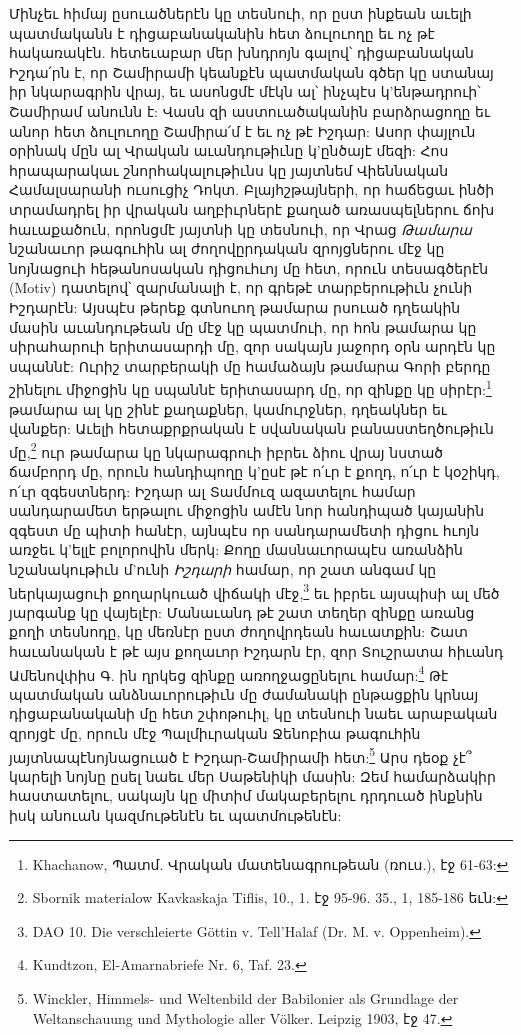 \documentclass{article}
\begin{document}
{Մինչեւ հիմայ ըսուածներէն կը տեսնուի, որ ըստ ինքեան աւելի պատմականն է դիցաբանականին հետ ձուլուողը եւ ոչ թէ հակառակէն. հետեւաբար մեր խնդրոյն գալով՝ դիցաբանական Իշդա՛րն է, որ Շամիրամի կեանքէն պատմական գծեր կը ստանայ իր նկարագրին վրայ, եւ ասոնցմէ մէկն ալ՝ ինչպէս կ'ենթադրուի՝ Շամիրամ անունն է: Վասն զի աստուածականին բարձրացողը եւ անոր հետ ձուլուողը Շամիրա՛մ է եւ ոչ թէ Իշդար: Ասոր փայլուն օրինակ մըն ալ Վրական աւանդութիւնը կ'ընծայէ մեզի: Հոս հրապարակաւ շնորհակալութիւնս կը յայտնեմ Վիեննական Համալսարանի ուսուցիչ Դոկտ. Բլայհշթայների, որ հաճեցաւ ինծի տրամադրել իր վրական աղբիւրներէ քաղած առասպելներու ճոխ հաւաքածուն, որոնցմէ յայտնի կը տեսնուի, որ Վրաց \emph{Թամարա} նշանաւոր թագուհին ալ ժողովըրդական զրոյցներու մէջ կը նոյնացուի հեթանոսական դիցուհւոյ մը հետ, որուն տեսագծերէն (Motiv) դատելով՝ զարմանալի է, որ գրեթէ տարբերութիւն չունի Իշդարէն: Այսպէս թերեք գտնուող թամարա րսուած դղեակին մասին աւանդութեան մը մէջ կը պատմուի, որ հոն թամարա կը սիրահարուի երիտասարդի մը, զոր սակայն յաջորդ օրն արդէն կը սպաննէ: Ուրիշ տարբերակի մը համաձայն թամարա Գորի բերդը շինելու միջոցին կը սպաննէ երիտասարդ մը, որ զինքը կը սիրէր:\footnote{Khachanow, Պատմ. Վրական մատենագրութեան (ռուս.), էջ 61-63:} թամարա ալ կը շինէ քաղաքներ, կամուրջներ, դղեակներ եւ վանքեր: Աւելի հետաքրքրական է սվանական բանաստեղծութիւն մը,\footnote{Sbornik materialow Kavkaskaja Tiflis, 10., 1. էջ 95-96. 35., 1, 185-186 եւն:} ուր թամարա կը նկարագրուի իբրեւ ձիու վրայ նստած ճամբորդ մը, որուն հանդիպողը կ'ըսէ թէ ո՛ւր է քողդ, ո՛ւր է կօշիկդ, ո՛ւր զգեստներդ: Իշդար ալ Տամմուզ ազատելու համար սանդարամետ երթալու միջոցին ամէն նոր հանդիպած կայանին զգեստ մը պիտի հանէր, այնպէս որ սանդարամետի դիցու հւոյն առջեւ կ'ելլէ բոլորովին մերկ: Քողը մասնաւորապէս առանձին նշանակութիւն մ'ունի \emph{Իշդարի} համար, որ շատ անգամ կը ներկայացուի քողարկուած վիճակի մէջ,\footnote{DAO 10. Die verschleierte Göttin v. Tell'Halaf (Dr. M. v. Oppenheim).} եւ իբրեւ այսպիսի ալ մեծ յարգանք կը վայելէր: Մանաւանդ թէ շատ տեղեր զինքը առանց քողի տեսնոդը, կը մեռնէր ըստ ժողովրդեան հաւատքին: Շատ հաւանական է թէ այս քողաւոր Իշդարն էր, զոր Տուշրատա հիւանդ Ամենովփիս Գ. ին ղրկեց զինքը առողջացընելու համար:\footnote{Kundtzon, El-Amarnabriefe Nr. 6, Taf. 23.} Թէ պատմական անձնաւորութիւն մը ժամանակի ընթացքին կրնայ դիցաբանականի մը հետ շփոթուիլ, կը տեսնուի նաեւ արաբական զրոյցէ մը, որուն մէջ Պալմիւրական Ջենոբիա թագուհին յայտնապէնոյնացուած է Իշդար-Շամիրամի հետ:\footnote{Winckler, Himmels- und Weltenbild der Babilonier als Grundlage der Weltanschauung und Mythologie aller Völker. Leipzig 1903, էջ 47.} Արս դեօք չէ՞ կարելի նոյնը ըսել նաեւ մեր Սաթենիկի մասին: Զեմ համարձակիր հաստատելու, սակայն կը միտիմ մակաբերելու դրդուած ինքնին իսկ անուան կազմութենէն եւ պատմութենէն:

}
\end{document}
